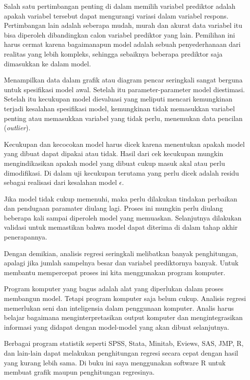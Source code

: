 \documentclass[
]{book}
\begin{document}
Salah satu pertimbangan penting di dalam memilih variabel prediktor
adalah apakah variabel tersebut dapat mengurangi variasi dalam variabel
respons. Pertimbangan lain adalah seberapa mudah, murah dan akurat data
variabel itu bisa diperoleh dibandingkan calon variabel prediktor yang
lain. Pemilihan ini harus cermat karena bagaimanapun model adalah sebuah
penyederhanaan dari realitas yang lebih kompleks, sehingga sebaiknya
beberapa prediktor saja dimasukkan ke dalam model.

Menampilkan data dalam grafik atau diagram pencar seringkali sangat
berguna untuk spesifikasi model awal. Setelah itu parameter-parameter
model diestimasi. Setelah itu kecukupan model dievaluasi yang meliputi
mencari kemungkinan terjadi kesalahan spesifikasi model, kemungkinan
tidak memasukkan variabel penting atau memasukkan variabel yang tidak
perlu, menemukan data pencilan (\emph{outlier}).

Kecukupan dan kecocokan model harus dicek karena menentukan apakah model
yang dibuat dapat dipakai atau tidak. Hasil dari cek kecukupan mungkin
mengindikasikan apakah model yang dibuat cukup masuk akal atau perlu
dimodifikasi. Di dalam uji kecukupan terutama yang perlu dicek adalah
residu sebagai realisasi dari kesalahan model \(\epsilon\).

Jika model tidak cukup memenuhi, maka perlu dilakukan tindakan perbaikan
dan pendugaan paramater diulang lagi. Proses ini mungkin perlu diulang
beberapa kali sampai diperoleh model yang memuaskan. Selanjutnya
dilakukan validasi untuk memastikan bahwa model dapat diterima di dalam
tahap akhir penerapannya.

Dengan demikian, analisis regresi seringkali melibatkan banyak
penghitungan, apalagi jika jumlah sampelnya besar dan variabel
prediktornya banyak. Untuk membantu mempercepat proses ini kita menggunakan program komputer.

Program komputer yang bagus adalah alat yang diperlukan dalam proses
membangun model. Tetapi program komputer saja belum cukup. Analisis
regresi memerlukan seni dan inteligensia dalam penggunaan komputer.
Analis harus belajar bagaimana menginterpretasikan output komputer dan
mengintegrasikan informasi yang didapat dengan model-model yang akan
dibuat selanjutnya.

Berbagai program statistik seperti SPSS, Stata, Minitab, Eviews, SAS,
JMP, R, dan lain-lain dapat melakukan penghitungan regresi secara cepat
dengan hasil yang kurang lebih sama. Di buku ini saya menggunakan
software R \citep{rcoreteam2021} untuk membuat grafik maupun penghitungan
regresinya.
\end{document}
